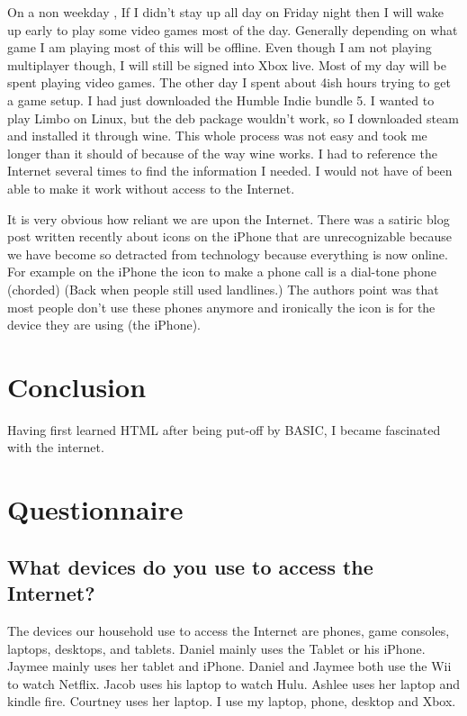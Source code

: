 \documentclass[12pt,letterpaper]{article}
\begin{document}
On a non weekday , If I didn't stay up all day on Friday night then I
will wake up early to play some video games most of the day. Generally
depending on what game I am playing most of this will be offline. Even
though I am not playing multiplayer though, I will still be signed into
Xbox live. Most of my day will be spent playing video games. The other
day I spent about 4ish hours trying to get a game setup. I had just
downloaded the Humble Indie bundle 5. I wanted to play Limbo on Linux, but
the deb package wouldn't work, so I downloaded steam and installed it
through wine. This whole process was not easy and took me longer than it
should of because of the way wine works. I had to reference the Internet
several times to find the information I needed. I would not have of been
able to make it work without access to the Internet.

It is very obvious how reliant we are upon the Internet. There was a
satiric blog post written recently about icons on the iPhone that are
unrecognizable because we have become so detracted from technology
because everything is now online. For example on the iPhone the icon to
make a phone call is a dial-tone phone (chorded) (Back when people still
used landlines.)  The authors point was that most people don't use these
phones anymore and ironically the icon is for the device they are using
(the iPhone).


\section{Conclusion}

Having first learned HTML after being put-off by BASIC, I became
fascinated with the internet.

\section{Questionnaire}
\subsection{What devices do you use to access the Internet?}
The devices our household use to access the Internet are phones, game
consoles, laptops, desktops, and tablets. Daniel mainly uses the Tablet
or his iPhone. Jaymee mainly uses her tablet and iPhone. Daniel and
Jaymee both use the Wii to watch Netflix. Jacob uses his
laptop to watch Hulu. Ashlee uses her laptop and kindle fire. Courtney uses her
laptop. I use my laptop, phone, desktop and Xbox.
\end{document}

